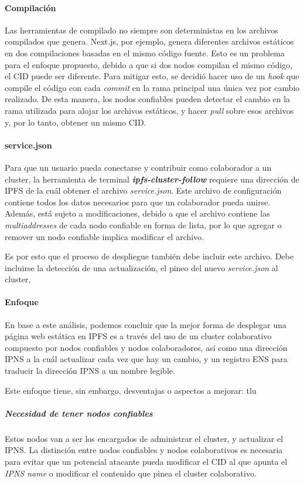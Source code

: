 \paragraph{Compilación} Las herramientas de compilado no siempre son deterministas en los archivos compilados que genera. Next.js, por ejemplo, genera diferentes archivos estáticos en dos compilaciones basadas en el mismo código fuente. Esto es un problema para el enfoque propuesto, debido a que si dos nodos compilan el mismo código, el CID puede ser diferente. Para mitigar esto, se decidió hacer uso de un \textit{hook} que compile el código con cada \textit{commit} en la rama principal una única vez por cambio realizado. De esta manera, los nodos confiables pueden detectar el cambio en la rama utilizada para alojar los archivos estáticos, y hacer \textit{pull} sobre esos archivos y, por lo tanto, obtener un mismo CID.

\paragraph{service.json} Para que un usuario pueda conectarse y contribuir como colaborador a un cluster, la herramienta de terminal \textit{\textbf{ipfs-cluster-follow}} requiere una dirección de IPFS de la cuál obtener el archivo \textit{service.json}. Este archivo de configuración contiene todos los datos necesarios para que un colaborador pueda unirse. Además, está sujeto a modificaciones, debido a que el archivo contiene las \textit{multiaddresses} de cada nodo confiable en forma de lista, por lo que agregar o remover un nodo confiable implica modificar el archivo.

Es por esto que el proceso de despliegue también debe incluir este archivo. Debe incluirse la detección de una actualización, el pineo del nuevo \textit{service.json} al cluster, 

\paragraph{Enfoque}

En base a este análisis, podemos concluir que la mejor forma de desplegar una página web estática en IPFS es a través del uso de un cluster colaborativo compuesto por nodos confiables y nodos colaboradores, así como una dirección IPNS a la cuál actualizar cada vez que hay un cambio, y un registro ENS para traducir la dirección IPNS a un nombre legible.

Este enfoque tiene, sin embargo, desventajas o aspectos a mejorar:
tlu
\subparagraph{Necesidad de tener nodos confiables} Estos nodos van a ser los encargados de administrar el cluster, y actualizar el IPNS. La distinción entre nodos confiables y nodos colaborativos es necesaria para evitar que un potencial atacante pueda modificar el CID al que apunta el \textit{IPNS name} o modificar el contenido que pinea el cluster colaborativo.
 
